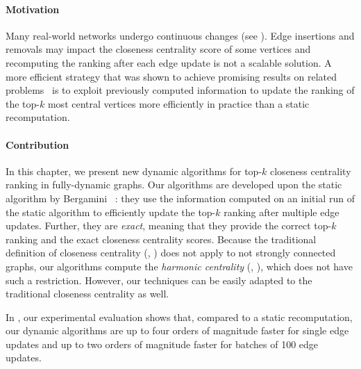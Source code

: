 \paragraph{Motivation}
Many real-world networks undergo continuous changes (see
). Edge insertions and removals may impact the
closeness centrality score of some vertices and recomputing the ranking after
each edge update is not a scalable solution.
%
A more efficient strategy that was shown to achieve promising results on
related
problems~\cite{DBLP:journals/im/BergaminiM16,DBLP:conf/socialcom/GreenMB12,
DBLP:conf/asunam/KasCC13,DBLP:conf/wea/BergaminiMOS17}
is to exploit previously computed information to update the ranking of the
top-$k$ most central vertices more efficiently in practice than a static
recomputation.

\paragraph{Contribution}
In this chapter, we present new dynamic algorithms for top-$k$
closeness centrality ranking in fully-dynamic graphs.
Our algorithms are developed upon the static algorithm by Bergamini
\etal~\cite{DBLP:journals/tkdd/BergaminiBCMM19}: they use the information
computed on an initial run of the static algorithm to efficiently update
the top-$k$ ranking after multiple edge updates.
Further, they are \emph{exact}, meaning that they provide the correct top-$k$
ranking and the exact closeness centrality scores.
%
Because the traditional definition of closeness centrality
(, ) does not
apply to not strongly connected graphs, our algorithms compute the \emph{harmonic
centrality} (, ),
which does not have such a restriction. However, our techniques can be
easily adapted to the traditional closeness centrality as well.

In , our experimental evaluation shows
that, compared to a static recomputation, our dynamic algorithms are up to
four orders of magnitude faster for single edge updates and up to two orders
of magnitude faster for batches of 100 edge updates.

